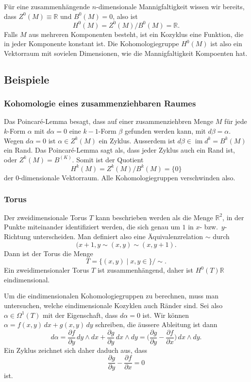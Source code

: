 Für eine zusammenhängende $n$-dimensionale Mannigfaltigkeit wissen wir
bereits, dass $Z^0(M)\equiv\mathbb{R}$ und $B^0(M)=0$, also ist
\[
H^0(M) = Z^0(M) / B^0(M) = \mathbb{R}.
\]
Falls $M$ aus mehreren Komponenten besteht, ist ein Kozyklus eine
Funktion, die in jeder Komponente konstant ist.
Die Kohomologiegruppe $H^0(M)$ ist also ein Vektorraum mit sovielen
Dimensionen, wie die Mannigfaltigkeit Kompoenten hat.

%
%
\subsection{Beispiele}


%
%
\subsubsection{Kohomologie eines zusammenziehbaren Raumes}
Das Poincaré-Lemma besagt, dass auf einer zusammenziehbren Menge
$M$ für jede $k$-Form $\alpha$ mit $d\alpha=0$ eine $k-1$-Form
$\beta$ gefunden werden kann, mit $d\beta = \alpha$.
Wegen $d\alpha=0$ ist $\alpha\in Z^k(M)$ ein Zyklus.
Ausserdem ist $d\beta\in \operatorname{im}d^k = B^k(M)$ ein Rand.
Das Poincaré-Lemma sagt als, dass jeder Zyklus auch ein Rand ist,
oder $Z^k(M) = B^(K)$.
Somit ist der Quotient
\[
H^k(M)
=
Z^k(M) / B^k(M)
=
\{0\}
\]
der 0-dimensionale Vektorraum.
Alle Kohomologiegruppen verschwinden also.

%
%
\subsubsection{Torus}
Der zweidimensionale Torus $T$ kann beschrieben werden als die
Menge $\mathbb{R}^2$, in der Punkte miteinander identifiziert
werden, die sich genau um $1$ in $x$- bzw.~$y$-Richtung unterscheiden.
Man definiert also eine Äquivalenzrelation $\sim$ durch
\[
(x+1,y \sim (x,y) \sim (x,y+1).
\]
Dann ist der Torus die Menge
\[
T
=
\{ (x,y) \mid x,y\in\mathbb\}
/
\sim.
\]
Ein zweidimensionaler Torus $T$ ist zusammenhängend, daher ist
$H^0(T)\mathbb{R}$ eindimensional.

Um die eindimensionalen Kohomologiegruppen zu berechnen, muss man
untersuchen, welche eindimensionale Kozyklen auch Ränder sind.
Sei also $\alpha\in \Omega^1(T)$ mit der Eigenschaft, dass $d\alpha=0$
ist.
Wir können $\alpha = f(x,y)\,dx + g(x,y)\,dy$ schreiben, die äussere Ableitung
ist dann
\[
d\alpha
=
\frac{\partial f}{\partial y}\,dy\wedge dx
+
\frac{\partial g}{\partial y}\,dx\wedge dy
=
\biggl(\frac{\partial g}{\partial y}-\frac{\partial f}{\partial x}\biggr)
\,dx\wedge dy.
\]
Ein Zyklus zeichnet sich daher daduch aus, dass
\begin{equation}
\frac{\partial g}{\partial y}-\frac{\partial f}{\partial x}
=
0
\label{buch:topologie:derham:eqn:integrabilitaet}
\end{equation}
ist.

